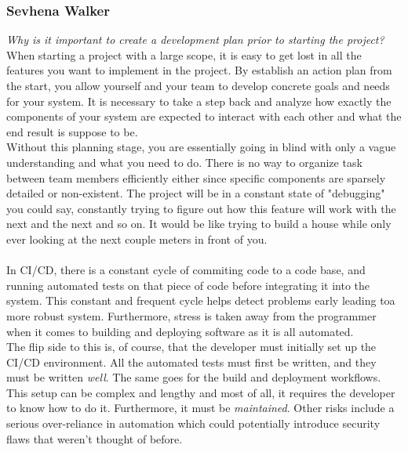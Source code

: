 \documentclass{article}
\begin{document}
\subsubsection*{Sevhena Walker}
\textit{Why is it important to create a development plan prior to starting the project?} \\

When starting a project with a large scope, it is easy to get lost in all the features you want to implement in the project. By establish an action plan from the start, you allow yourself and your team to develop concrete goals and needs for your system. It is necessary to take a step back and analyze how exactly the components of your system are expected to interact with each other and what the end result is suppose to be.\\

Without this planning stage, you are essentially going in blind with only a vague understanding and what you need to do. There is no way to organize task between team members efficiently either since specific components are sparsely detailed or non-existent. The project will be in a constant state of "debugging" you could say, constantly trying to figure out how this feature will work with the next and the next and so on. It would be like trying to build a house while only ever looking at the next couple meters in front of you. \\

 \\

In CI/CD, there is a constant cycle of commiting code to a code base, and running automated tests on that piece of code before integrating it into the system. This constant and frequent cycle helps detect problems early leading toa more robust system. Furthermore, stress is taken away from the programmer when it comes to building and deploying software as it is all automated.\\

The flip side to this is, of course, that the developer must initially set up the CI/CD environment. All the automated tests must first be written, and they must be written \textit{well}. The same goes for the build and deployment workflows. This setup can be complex and lengthy and most of all, it requires the developer to know how to do it. Furthermore, it must be \textit{maintained}. Other risks include a serious over-reliance in automation which could potentially introduce security flaws that weren't thought of before.\\
\end{document}
